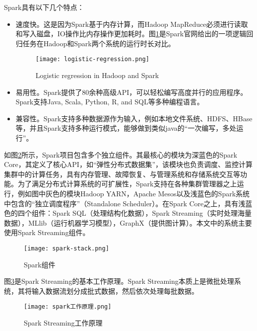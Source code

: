 Spark具有以下几个特点：

\begin{itemize}
  \item 速度快。这是因为Spark基于内存计算，而Hadoop MapReduce必须进行读取和写入磁盘，IO操作比内存操作更加耗时。图\ref{fig:Logistic regression in Hadoop and Spark}是Spark官网给出的一项逻辑回归任务在Hadoop和Spark两个系统的运行时长对比。
   \begin{figure}
    \centering
    \texttt{[image: logistic-regression.png]}
    \caption{Logistic regression in Hadoop and Spark}
    \label{fig:Logistic regression in Hadoop and Spark}
  \end{figure}
  \item 易用性。Spark提供了80余种高级API，可以轻松编写高度并行的应用程序。Spark支持Java, Scala, Python, R, and SQL等多种编程语言。
  \item 兼容性。Spark支持多种数据源作为输入，例如本地文件系统、HDFS、HBase等，并且Spark支持多种运行模式，能够做到类似java的“一次编写，多处运行”。
\end{itemize}



如图\ref{fig:Spark组件}所示\cite{spark}，Spark项目包含多个独立组件。其最核心的模块为深蓝色的Spark Core，其定义了核心API，如“弹性分布式数据集”，该模块也负责调度、监控计算集群中的计算任务，具有内存管理、故障恢复、与管理系统和存储系统交互等功能。为了满足分布式计算系统的可扩展性，Spark支持在各种集群管理器之上运行，例如图中灰色的模块Hadoop YARN，Apache Mesos以及浅蓝色的Spark系统中包含的“独立调度程序”（Standalone Scheduler）。在Spark Core之上，具有浅蓝色的四个组件：Spark SQL（处理结构化数据），Spark Streaming（实时处理海量数据），MLlib（运行机器学习模型），GraphX（提供图计算）。本文中的系统主要使用Spark Streaming组件。



\begin{figure}
  \centering
  \texttt{[image: spark-stack.png]}
  \caption{Spark组件}
  \label{fig:Spark组件}
\end{figure}

图\ref{fig:spark工作原理}是Spark Streaming的基本工作原理\cite{spark}。Spark Streaming本质上是微批处理系统，其将输入数据流划分成批式数据，然后依次处理每批数据。
\begin{figure}
  \centering
  \texttt{[image: spark工作原理.png]}
  \caption{Spark Streaming工作原理}
  \label{fig:spark工作原理}
\end{figure}

